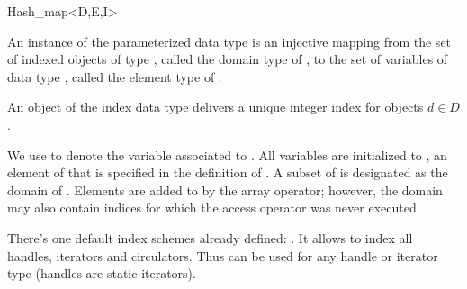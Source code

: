 
\begin{ccRefClass}{Hash_map<D,E,I>}

\ccDefinition

An instance  of the parameterized data type
 is an injective mapping from the set of indexed objects of
type , called the domain type of , to the set of variables
of data type , called the element type of .

An object  of the index data type  delivers a unique integer
index  for objects $d \in D$.

We use  to denote the variable associated to . All variables
are initialized to , an element of  that is
specified in the definition of . A subset of  is designated as
the domain of . Elements are added to  by the array
operator; however, the domain may also contain indices for which the
access operator was never executed.

There's one default index schemes already defined: .  It
allows to index all handles, iterators and circulators.  Thus
 can be used for any handle or iterator type  (handles
are static iterators). 



\ccSetOneOfTwoColumns{5cm}

\ccTypes






\ccSetOneOfTwoColumns{4cm}

\ccCreation




\end{ccRefClass}
